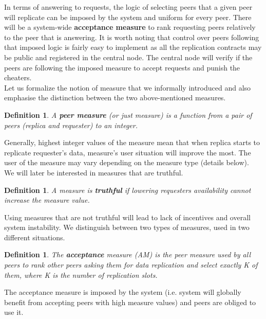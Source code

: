 \documentclass{pracamgren}
\newcounter{collective_ctr} \numberwithin{collective_ctr}{chapter}
\newtheorem{definition}[collective_ctr]{Definition}
\begin{document}
In terms of answering to requests, the logic of selecting peers that a given peer will replicate can be imposed by the system and uniform for every peer. There will be a system-wide {\bf acceptance measure} to rank requesting peers relatively to the peer that is answering. It is worth noting that control over peers following that imposed logic is fairly easy to implement as all the replication contracts may be public and registered in the central node. The central node will verify if the peers are following the imposed measure to accept requests and punish the cheaters.\\

Let us formalize the notion of measure that we informally introduced and also emphasise the distinction between the two above-mentioned measures.

\begin{definition}
A {\bf peer measure} (or just measure) is a function from a pair of peers (replica and requester) to an integer.
\end{definition}

Generally, highest integer values of the measure mean that when replica starts to replicate requester's data, measure's user situation will improve the most. The user of the measure may vary depending on the measure type (details below).\\

We will later be interested in measures that are truthful.

\begin{definition}
A measure is {\bf truthful} if lowering requesters availability cannot increase the measure value.
\end{definition}

Using measures that are not truthful will lead to lack of incentives and overall system instability. We distinguish between two types of measures, used in two different situations.\\

\begin{definition}
The {\bf acceptance} measure (AM) is the peer measure used by all peers to rank other peers asking them for data replication and select exactly K of them, where K is the number of replication slots.
\end{definition}

The acceptance measure is imposed by the system (i.e. system will globally benefit from accepting peers with high measure values) and peers are obliged to use it.\\
\end{document}
